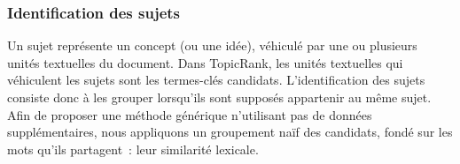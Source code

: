       \subsubsection{Identification des sujets}
      \label{subsubsec:main:domain_independent_keyphrase_extraction-unsupervised_automatic_keyphrase_extraction-topicrank-topic_identification}
        Un sujet représente un concept (ou une idée), véhiculé par une ou plusieurs
        unités textuelles du document. Dans TopicRank, les unités textuelles qui véhiculent
        les sujets sont les termes-clés candidats.
%
%
        L'identification des sujets consiste donc à les grouper lorsqu'ils sont
        supposés appartenir au même sujet.
        Afin de proposer une méthode générique n'utilisant pas de données
        supplémentaires, nous appliquons un groupement \og{}naïf\fg{} des
        candidats, fondé sur les mots qu'ils partagent~: leur similarité
        lexicale.

